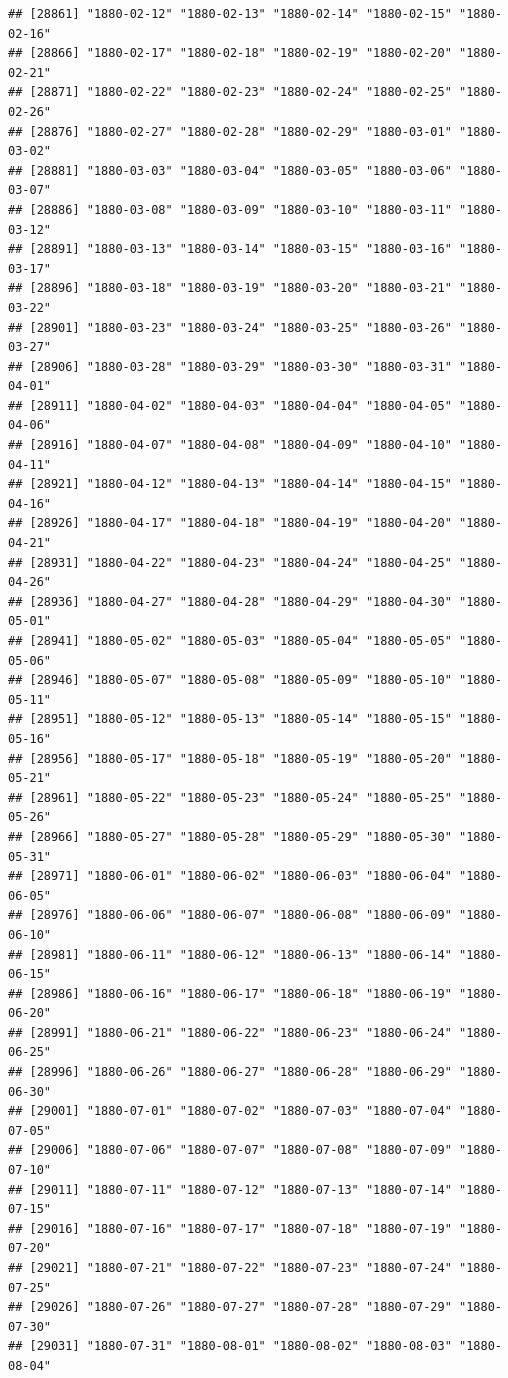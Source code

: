 \documentclass{article}\usepackage[]{graphicx}\usepackage[]{color}
\makeatletter
\newenvironment{kframe}{%
 \def\at@end@of@kframe{}%
 \ifinner\ifhmode%
  \def\at@end@of@kframe{\end{minipage}}%
  \begin{minipage}{\columnwidth}%
 \fi\fi%
 \def\FrameCommand##1{\hskip\@totalleftmargin \hskip-\fboxsep
 \colorbox{shadecolor}{##1}\hskip-\fboxsep
     \hskip-\linewidth \hskip-\@totalleftmargin \hskip\columnwidth}%
 \MakeFramed {\advance\hsize-\width
   \@totalleftmargin\z@ \linewidth\hsize
   \@setminipage}}%
 {\par\unskip\endMakeFramed%
 \at@end@of@kframe}
\newenvironment{knitrout}{}{} %
\makeatother
\begin{document}
\begin{description}
\begin{knitrout}
\begin{kframe}
\begin{verbatim}
## [28861] "1880-02-12" "1880-02-13" "1880-02-14" "1880-02-15" "1880-02-16"
## [28866] "1880-02-17" "1880-02-18" "1880-02-19" "1880-02-20" "1880-02-21"
## [28871] "1880-02-22" "1880-02-23" "1880-02-24" "1880-02-25" "1880-02-26"
## [28876] "1880-02-27" "1880-02-28" "1880-02-29" "1880-03-01" "1880-03-02"
## [28881] "1880-03-03" "1880-03-04" "1880-03-05" "1880-03-06" "1880-03-07"
## [28886] "1880-03-08" "1880-03-09" "1880-03-10" "1880-03-11" "1880-03-12"
## [28891] "1880-03-13" "1880-03-14" "1880-03-15" "1880-03-16" "1880-03-17"
## [28896] "1880-03-18" "1880-03-19" "1880-03-20" "1880-03-21" "1880-03-22"
## [28901] "1880-03-23" "1880-03-24" "1880-03-25" "1880-03-26" "1880-03-27"
## [28906] "1880-03-28" "1880-03-29" "1880-03-30" "1880-03-31" "1880-04-01"
## [28911] "1880-04-02" "1880-04-03" "1880-04-04" "1880-04-05" "1880-04-06"
## [28916] "1880-04-07" "1880-04-08" "1880-04-09" "1880-04-10" "1880-04-11"
## [28921] "1880-04-12" "1880-04-13" "1880-04-14" "1880-04-15" "1880-04-16"
## [28926] "1880-04-17" "1880-04-18" "1880-04-19" "1880-04-20" "1880-04-21"
## [28931] "1880-04-22" "1880-04-23" "1880-04-24" "1880-04-25" "1880-04-26"
## [28936] "1880-04-27" "1880-04-28" "1880-04-29" "1880-04-30" "1880-05-01"
## [28941] "1880-05-02" "1880-05-03" "1880-05-04" "1880-05-05" "1880-05-06"
## [28946] "1880-05-07" "1880-05-08" "1880-05-09" "1880-05-10" "1880-05-11"
## [28951] "1880-05-12" "1880-05-13" "1880-05-14" "1880-05-15" "1880-05-16"
## [28956] "1880-05-17" "1880-05-18" "1880-05-19" "1880-05-20" "1880-05-21"
## [28961] "1880-05-22" "1880-05-23" "1880-05-24" "1880-05-25" "1880-05-26"
## [28966] "1880-05-27" "1880-05-28" "1880-05-29" "1880-05-30" "1880-05-31"
## [28971] "1880-06-01" "1880-06-02" "1880-06-03" "1880-06-04" "1880-06-05"
## [28976] "1880-06-06" "1880-06-07" "1880-06-08" "1880-06-09" "1880-06-10"
## [28981] "1880-06-11" "1880-06-12" "1880-06-13" "1880-06-14" "1880-06-15"
## [28986] "1880-06-16" "1880-06-17" "1880-06-18" "1880-06-19" "1880-06-20"
## [28991] "1880-06-21" "1880-06-22" "1880-06-23" "1880-06-24" "1880-06-25"
## [28996] "1880-06-26" "1880-06-27" "1880-06-28" "1880-06-29" "1880-06-30"
## [29001] "1880-07-01" "1880-07-02" "1880-07-03" "1880-07-04" "1880-07-05"
## [29006] "1880-07-06" "1880-07-07" "1880-07-08" "1880-07-09" "1880-07-10"
## [29011] "1880-07-11" "1880-07-12" "1880-07-13" "1880-07-14" "1880-07-15"
## [29016] "1880-07-16" "1880-07-17" "1880-07-18" "1880-07-19" "1880-07-20"
## [29021] "1880-07-21" "1880-07-22" "1880-07-23" "1880-07-24" "1880-07-25"
## [29026] "1880-07-26" "1880-07-27" "1880-07-28" "1880-07-29" "1880-07-30"
## [29031] "1880-07-31" "1880-08-01" "1880-08-02" "1880-08-03" "1880-08-04"

\end{verbatim}
\end{kframe}
\end{knitrout}
\end{description}
\end{document}

